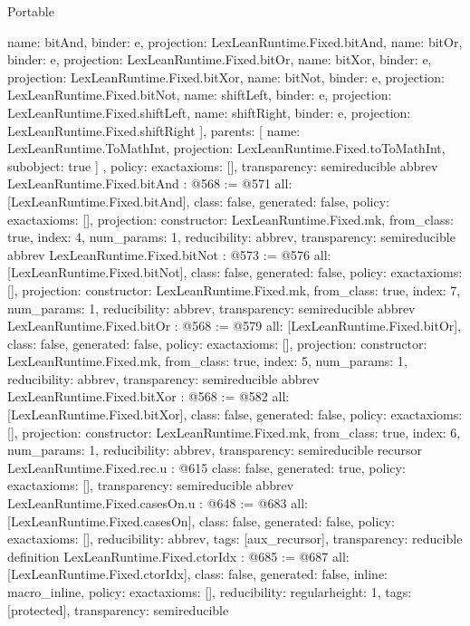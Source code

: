 \begin{lexlean}{Portable}
\begin{coremodule}
{{{        {name: bitAnd, binder: e, projection: LexLeanRuntime.Fixed.bitAnd},
        {name: bitOr, binder: e, projection: LexLeanRuntime.Fixed.bitOr},
        {name: bitXor, binder: e, projection: LexLeanRuntime.Fixed.bitXor},
        {name: bitNot, binder: e, projection: LexLeanRuntime.Fixed.bitNot},
        {name: shiftLeft, binder: e, projection: LexLeanRuntime.Fixed.shiftLeft},
        {name: shiftRight, binder: e, projection: LexLeanRuntime.Fixed.shiftRight}
      ],
      parents: [
        {
          name: LexLeanRuntime.ToMathInt,
          projection: LexLeanRuntime.Fixed.toToMathInt,
          subobject: true
        }
      ]
    }
  },
  policy: exact{axioms: []},
  transparency: semireducible
}
abbrev LexLeanRuntime.Fixed.bitAnd : @568 := @571 {
  all: [LexLeanRuntime.Fixed.bitAnd],
  class: false,
  generated: false,
  policy: exact{axioms: []},
  projection: {constructor: LexLeanRuntime.Fixed.mk, from_class: true, index: 4, num_params: 1},
  reducibility: abbrev{},
  transparency: semireducible
}
abbrev LexLeanRuntime.Fixed.bitNot : @573 := @576 {
  all: [LexLeanRuntime.Fixed.bitNot],
  class: false,
  generated: false,
  policy: exact{axioms: []},
  projection: {constructor: LexLeanRuntime.Fixed.mk, from_class: true, index: 7, num_params: 1},
  reducibility: abbrev{},
  transparency: semireducible
}
abbrev LexLeanRuntime.Fixed.bitOr : @568 := @579 {
  all: [LexLeanRuntime.Fixed.bitOr],
  class: false,
  generated: false,
  policy: exact{axioms: []},
  projection: {constructor: LexLeanRuntime.Fixed.mk, from_class: true, index: 5, num_params: 1},
  reducibility: abbrev{},
  transparency: semireducible
}
abbrev LexLeanRuntime.Fixed.bitXor : @568 := @582 {
  all: [LexLeanRuntime.Fixed.bitXor],
  class: false,
  generated: false,
  policy: exact{axioms: []},
  projection: {constructor: LexLeanRuntime.Fixed.mk, from_class: true, index: 6, num_params: 1},
  reducibility: abbrev{},
  transparency: semireducible
}
recursor LexLeanRuntime.Fixed.rec.{u} : @615 {
  class: false,
  generated: true,
  policy: exact{axioms: []},
  transparency: semireducible
}
abbrev LexLeanRuntime.Fixed.casesOn.{u} : @648 := @683 {
  all: [LexLeanRuntime.Fixed.casesOn],
  class: false,
  generated: false,
  policy: exact{axioms: []},
  reducibility: abbrev{},
  tags: [aux_recursor],
  transparency: reducible
}
definition LexLeanRuntime.Fixed.ctorIdx : @685 := @687 {
  all: [LexLeanRuntime.Fixed.ctorIdx],
  class: false,
  generated: false,
  inline: macro_inline,
  policy: exact{axioms: []},
  reducibility: regular{height: 1},
  tags: [protected],
  transparency: semireducible
}
\end{coremodule}
\end{lexlean}
